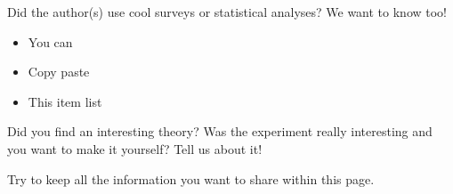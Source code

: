 \documentclass{kdl-summary}
\begin{document}
\begin{tools}
    Did the author(s) use cool surveys or statistical analyses? We want to know
    too!

    \begin{itemize}
        \item You can
        \item Copy paste
        \item This item list
    \end{itemize}
\end{tools}

\begin{extra-info}
    Did you find an interesting theory? Was the experiment really interesting
    and you want to make it yourself? Tell us about it!

    Try to keep all the information you want to share within this page.
\end{extra-info}

\printbibliography[title=Summary From:]
\end{document}
